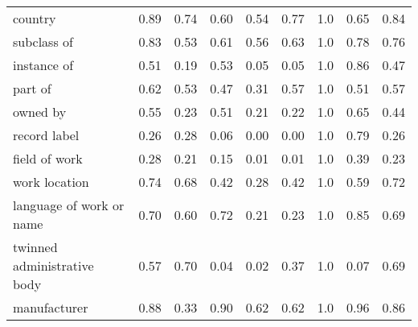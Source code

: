 \begin{table*}[t]
{\begin{tabular}{lrrrrrrrr}
                              country &                      0.89 &                        0.74 &      0.60 &            0.54 &                 0.77 &                  1.0 &                 0.65 &         0.84 \\
                          subclass of &                      0.83 &                        0.53 &      0.61 &            0.56 &                 0.63 &                  1.0 &                 0.78 &         0.76 \\
                          instance of &                      0.51 &                        0.19 &      0.53 &            0.05 &                 0.05 &                  1.0 &                 0.86 &         0.47 \\
                              part of &                      0.62 &                        0.53 &      0.47 &            0.31 &                 0.57 &                  1.0 &                 0.51 &         0.57 \\
                             owned by &                      0.55 &                        0.23 &      0.51 &            0.21 &                 0.22 &                  1.0 &                 0.65 &         0.44 \\
                         record label &                      0.26 &                        0.28 &      0.06 &            0.00 &                 0.00 &                  1.0 &                 0.79 &         0.26 \\
                        field of work &                      0.28 &                        0.21 &      0.15 &            0.01 &                 0.01 &                  1.0 &                 0.39 &         0.23 \\
                        work location &                      0.74 &                        0.68 &      0.42 &            0.28 &                 0.42 &                  1.0 &                 0.59 &         0.72 \\
             language of work or name &                      0.70 &                        0.60 &      0.72 &            0.21 &                 0.23 &                  1.0 &                 0.85 &         0.69 \\
          twinned administrative body &                      0.57 &                        0.70 &      0.04 &            0.02 &                 0.37 &                  1.0 &                 0.07 &         0.69 \\
                         manufacturer &                      0.88 &                        0.33 &      0.90 &            0.62 &                 0.62 &                  1.0 &                 0.96 &         0.86 \\

\end{tabular}}
\end{table*}
